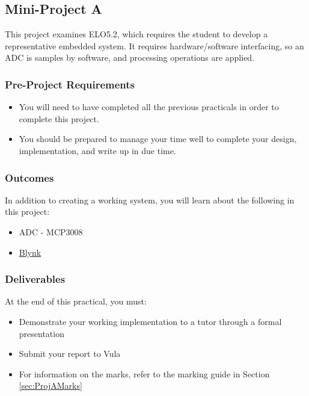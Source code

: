 \subsection{Mini-Project A}
\label{sec:ProjA}
This project examines ELO5.2, which requires the student to develop a representative embedded system. It requires hardware/software interfacing, so an ADC is samples by software, and processing operations are applied. 

\subsubsection{Pre-Project Requirements}
\begin{itemize}
    \item You will need to have completed all the previous practicals in order to complete this project.
    \item You should be prepared to manage your time well to complete your design, implementation, and write up in due time.
\end{itemize}

\subsubsection{Outcomes}
In addition to creating a working system, you will learn about the following in this project:
\begin{itemize}
    \item ADC - MCP3008
    \item \href{https://blynk.io/}{Blynk}
\end{itemize}

\subsubsection{Deliverables}
At the end of this practical, you must:
\begin{itemize}
    \item Demonstrate your working implementation to a tutor through a formal presentation
    \item Submit your report to Vula
    \item For information on the marks, refer to the marking guide in Section \ref{sec:ProjAMarks}
\end{itemize}

